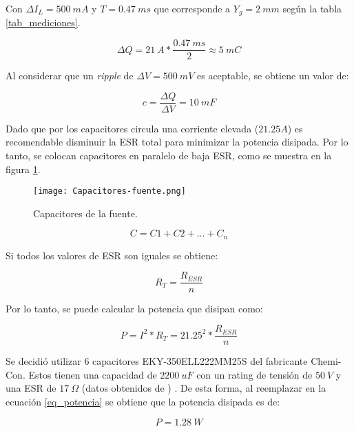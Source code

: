 \noindent Con $\Delta I_L=500 \:mA$ y $T=0.47\:ms$ que corresponde a $Y_g = 2 \:mm$ según la tabla \ref{tab_mediciones}.

\begin{equation} 
	\Delta Q = 21\:A * \frac{0.47\:ms}{2} \approx 5\:mC
\end{equation}

\noindent Al considerar que un \textsl{ripple} de $\Delta V=500 \:mV$ es aceptable, se obtiene un valor de:

\begin{equation} 
	c = \frac{\Delta Q}{\Delta V} = 10 \:mF
\end{equation}

\noindent Dado que por los capacitores circula una corriente elevada ($21.25 A$) es recomendable disminuir la ESR total para minimizar la potencia disipada. Por lo tanto, se colocan capacitores en paralelo de baja ESR, como se muestra en la figura \ref{fig:img_capacitores-fuente}.

\begin{figure}[H]
	\centering
	\texttt{[image: Capacitores-fuente.png]}
	\caption{Capacitores de la fuente.}
	\label{fig:img_capacitores-fuente}
\end{figure}


\begin{equation} 
	C = C1 + C2 + ... + C_n
\end{equation}


\noindent Si todos los valores de ESR son iguales se obtiene:

\begin{equation} 
	R_T = \frac{R_{ESR}}{n}
\end{equation}

\noindent Por lo tanto, se puede calcular la potencia que disipan como:

\begin{equation}\label{eq_potencia} 
	P = I^2 * R_T = 21.25^2 * \frac{R_{ESR}}{n}
\end{equation}

\noindent Se decidió utilizar 6 capacitores  EKY-350ELL222MM25S del fabricante Chemi-Con. Estos tienen una capacidad de $2200 \:uF$ con un rating de tensión de $50\:V$ y una ESR de $17 \:\Omega$ (datos obtenidos de \cite{EKY-350ELL222MM25S}) . De esta forma, al reemplazar en la ecuación \ref{eq_potencia} se obtiene que la potencia disipada es de: 

\begin{equation} 
	P=1.28\:W
\end{equation}

